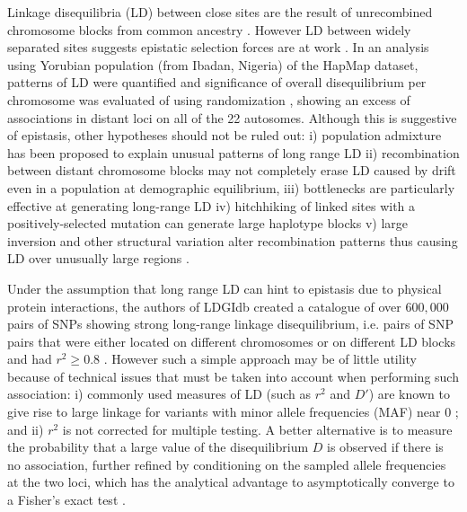 Linkage disequilibria (LD) between close sites are the result of unrecombined chromosome blocks from common ancestry \cite{reich2001linkage}.
However LD between widely separated sites suggests epistatic selection forces are at work \cite{fisher1958genetical, koch2013long}.
In an analysis using Yorubian population (from Ibadan, Nigeria) of the HapMap dataset, patterns of LD were quantified and significance of overall disequilibrium per chromosome was evaluated of using randomization \cite{koch2013long}, showing an excess of associations in distant loci on all of the 22 autosomes. 
Although this is suggestive of epistasis, other hypotheses should not be ruled out:
i) population admixture has been proposed to explain unusual patterns of long range LD \cite{price2008long}
ii) recombination between distant chromosome blocks may not completely erase LD caused by drift even in a population at demographic equilibrium, 
iii) bottlenecks are particularly effective at generating long-range LD
iv) hitchhiking of linked sites with a positively-selected mutation can generate large haplotype blocks 
v) large inversion and other structural variation alter recombination patterns thus causing LD over unusually large regions \cite{bansal2007evidence}.

Under the assumption that long range LD can hint to epistasis due to physical protein interactions, the authors of LDGIdb \cite{wang2012ldgidb} created a catalogue of over $600,000$ pairs of SNPs showing strong long-range linkage disequilibrium, i.e. pairs of SNP pairs that were either located on different chromosomes or on different LD blocks and had $r^2 \ge 0.8$ \cite{wang2012ldgidb}.
However such a simple approach may be of little utility because of technical issues that must be taken into account when performing such association: i) commonly used measures of LD (such as $r^2$ and $D'$) are known to give rise to large linkage for variants with minor allele frequencies (MAF) near 0 \cite{koch2013long}; and ii) $r^2$ is not corrected for multiple testing.
A better alternative is to measure the probability that a large value of the disequilibrium $D$ is observed if there is no association, further refined by conditioning on the sampled allele frequencies at the two loci, which has the analytical advantage to asymptotically converge to a Fisher's exact test \cite{koch2013long}.

